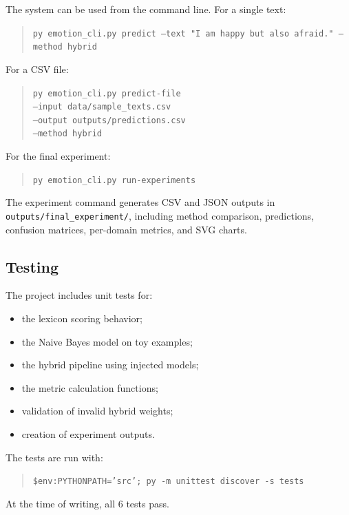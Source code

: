 The system can be used from the command line. For a single text:

\begin{quote}
\texttt{py emotion\_cli.py predict --text "I am happy but also afraid." --method hybrid}
\end{quote}

For a CSV file:

\begin{quote}
\small
\texttt{py emotion\_cli.py predict-file}\\
\texttt{--input data/sample\_texts.csv}\\
\texttt{--output outputs/predictions.csv}\\
\texttt{--method hybrid}
\end{quote}

For the final experiment:

\begin{quote}
\texttt{py emotion\_cli.py run-experiments}
\end{quote}

The experiment command generates CSV and JSON outputs in \texttt{outputs/final\_experiment/}, including method comparison, predictions, confusion matrices, per-domain metrics, and SVG charts.

\subsection{Testing}

The project includes unit tests for:

\begin{itemize}
    \item the lexicon scoring behavior;
    \item the Naive Bayes model on toy examples;
    \item the hybrid pipeline using injected models;
    \item the metric calculation functions;
    \item validation of invalid hybrid weights;
    \item creation of experiment outputs.
\end{itemize}

The tests are run with:

\begin{quote}
\texttt{\$env:PYTHONPATH='src'; py -m unittest discover -s tests}
\end{quote}

At the time of writing, all 6 tests pass.
